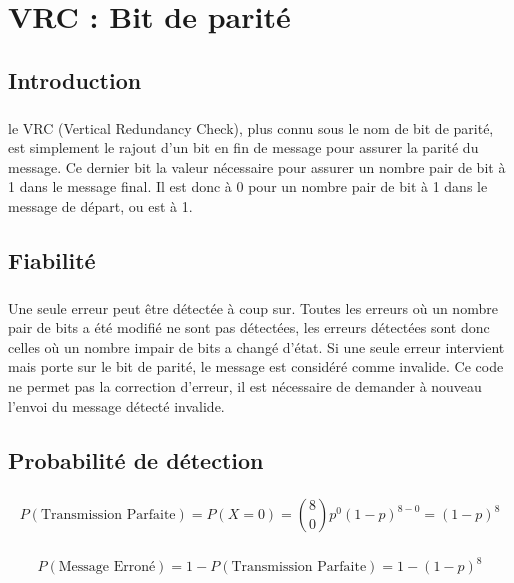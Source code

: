 
\chapter{VRC : Bit de parité}

    \section{Introduction}

        \paragraph{}
le VRC (Vertical Redundancy Check), plus connu sous le nom de bit de parité,
est simplement le rajout d'un bit en fin de message pour assurer la parité du message.
Ce dernier bit la valeur nécessaire pour assurer un nombre pair de bit à 1 dans le message final.
Il est donc à 0 pour un nombre pair de bit à 1 dans le message de départ, ou est à 1.


    \clearpage

    \section{Fiabilité}

        \paragraph{}
Une seule erreur peut être détectée à coup sur.
Toutes les erreurs où un nombre pair de bits a été modifié ne sont pas détectées,
les erreurs détectées sont donc celles où un nombre impair de bits a changé d'état.
Si une seule erreur intervient mais porte sur le bit de parité, le message est considéré comme invalide.
Ce code ne permet pas la correction d'erreur, il est nécessaire de demander à nouveau l'envoi du message détecté invalide.


    \section{Probabilité de détection}

        \paragraph{}
\[  P(\text{Transmission Parfaite}) = P(X=0) = {8\choose 0}p^0(1-p)^{8-0} = (1-p)^8 \]
        \paragraph{}
\[  P(\text{Message Erroné}) = 1 - P(\text{Transmission Parfaite}) = 1 - (1-p)^8 \]
